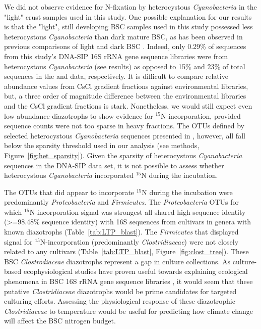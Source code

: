 We did not observe evidence for N-fixation by heterocystous
\textit{Cyanobacteria} in the "light" crust samples used in this study. One
possible explanation for our results is that the "light", still developing
BSC samples used in this study possessed less heterocystous
\textit{Cyanobacteria} than dark mature BSC, as has been observed in previous
comparisons of light and dark BSC \citep{14766579}.  Indeed, only 0.29\% of
sequences from this study's DNA-SIP 16S rRNA gene sequence libraries were
from heterocystous \textit{Cyanobacteria} (see results) as opposed to 15\%
and 23\% of total sequences in the \citet{Steven_2013} and
\citet{Garcia_Pichel_2013} data, respectively. It is difficult to compare
relative abundance values from CsCl gradient fractions against environmental
libraries, but, a three order of magnitude difference between the
environmental libraries and the CsCl gradient fractions is stark.
Nonetheless, we would still expect even low abundance diazotrophs to show
evidence for $^{15}$N-incorporation, provided sequence counts were not too
sparse in heavy fractions. The OTUs defined by selected heterocystous
\textit{Cyanobacteria} sequences presented in \citet{Yeager}, however, all
fall below the sparsity threshold used in our analysis (see methods,
Figure~\ref{fig:het_sparsity}). Given the sparsity of heterocystous
\textit{Cyanobacteria} sequences in the DNA-SIP data set, it is not possible
to assess whether heterocystous \textit{Cyanobacteria} incorporated $^{15}$N
during the incubation.

The OTUs that did appear to incorporate $^{15}$N during the incubation were
predominantly \textit{Proteobacteria} and \textit{Firmicutes}. The
\textit{Proteobacteria} OTUs for which $^{15}$N-incorporation signal was
strongest all shared high sequence identity (\textgreater=98.48\% sequence
identity) with 16S sequences from cultivars in genera with known diazotrophs
(Table~\ref{tab:LTP_blast}). The \textit{Firmicutes} that displayed signal
for $^{15}$N-incorporation (predominantly \textit{Clostridiaceae}) were not
closely related to any cultivars (Table~\ref{tab:LTP_blast},
Figure~\ref{fig:clost_tree}). These BSC \textit{Clostrodiaceae} diazotrophs
represent a gap in culture collections. As culture-based ecophysiological
studies have proven useful towards explaining ecological phenomena in BSC 16S
rRNA gene sequence libraries \citep{Garcia_Pichel_2013}, it would seem that
these putative \textit{Clostridiaceae} diazotrophs would be prime candidates
for targeted culturing efforts. Assessing the physiological response of these
diazotrophic \textit{Clostridiaceae} to temperature would be useful for
predicting how climate change will affect the BSC nitrogen budget. 

